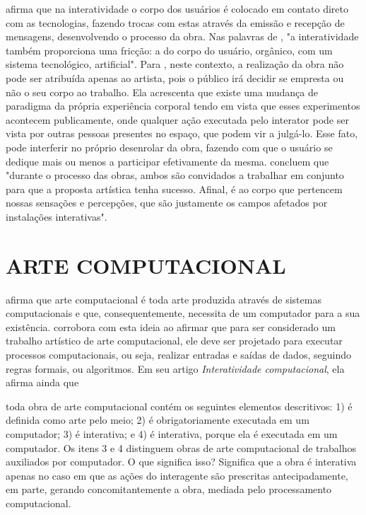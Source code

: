  afirma que na interatividade o corpo dos usuários é colocado em contato direto com as tecnologias, fazendo trocas com estas através da emissão e recepção de mensagens, desenvolvendo o processo da obra. Nas palavras de , "a interatividade também proporciona uma fricção: a do corpo do usuário, orgânico, com um sistema tecnológico, artificial". Para , neste contexto, a realização da obra não pode ser atribuída apenas ao artista, pois o público irá decidir se empresta ou não o seu corpo ao trabalho. Ela acrescenta que existe uma mudança de paradigma da própria experiência corporal tendo em vista que esses experimentos acontecem publicamente, onde qualquer ação executada pelo interator pode ser vista por outras pessoas presentes no espaço, que podem vir a julgá-lo. Esse fato, pode interferir no próprio desenrolar da obra, fazendo com que o usuário se dedique mais ou menos a participar efetivamente da mesma.  concluem que "durante o processo das obras, ambos são convidados a trabalhar em conjunto para que a proposta artística tenha sucesso. Afinal, é ao corpo que pertencem nossas sensações e percepções, que são justamente os campos afetados por instalações interativas".

\section{ARTE COMPUTACIONAL}

 afirma que arte computacional é toda arte produzida através de sistemas  computacionais e que, consequentemente, necessita de um computador para a sua existência.  corrobora com esta ideia ao afirmar que para ser considerado um trabalho artístico de arte computacional, ele deve ser projetado para executar processos computacionais, ou seja, realizar entradas e saídas de dados, seguindo regras formais, ou algoritmos. Em seu artigo \textit{Interatividade computacional}, ela afirma ainda que

\begin{citacao}
toda obra de arte computacional contém os seguintes elementos descritivos: 1) é definida como arte pelo meio; 2) é obrigatoriamente executada em um computador; 3) é interativa; e 4) é interativa, porque ela é executada em um computador. Os itens 3 e 4 distinguem obras de arte computacional de trabalhos auxiliados por computador. O que significa isso? Significa que a obra é interativa apenas no caso em que as ações do interagente são prescritas antecipadamente, em parte, gerando concomitantemente a obra, mediada pelo processamento computacional.  \cite[p. 133]{venturelli}
\end{citacao}

